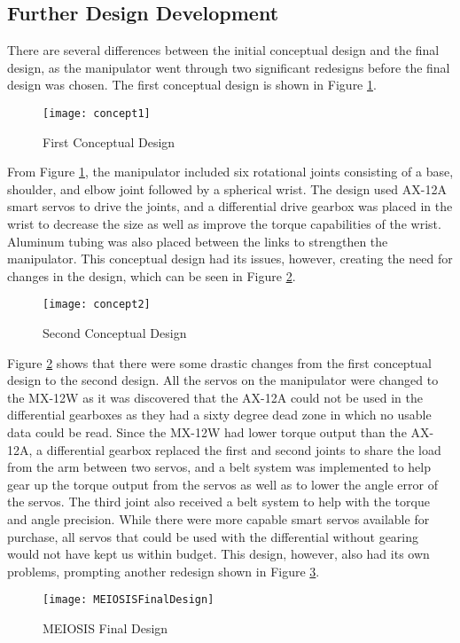 \subsection{Further Design Development}
There are several differences between the initial conceptual design and the final design, as the manipulator went through two significant redesigns before the final design was chosen. The first conceptual design is shown in Figure \ref{fig:concept1}.
\begin{figure}[htp]
  \centering
  \texttt{[image: concept1]}
  \caption{First Conceptual Design}
  \label{fig:concept1}
\end{figure}
From Figure \ref{fig:concept1}, the manipulator included six rotational joints consisting of a base, shoulder, and elbow joint followed by a spherical wrist. The design used AX-12A smart servos to drive the joints, and a differential drive gearbox was placed in the wrist to decrease the size as well as improve the torque capabilities of the wrist. Aluminum tubing was also placed between the links to strengthen the manipulator. This conceptual design had its issues, however, creating the need for changes in the design, which can be seen in Figure \ref{fig:concept2}.
\begin{figure}[htp]
  \centering
  \texttt{[image: concept2]}
  \caption{Second Conceptual Design}
  \label{fig:concept2}
\end{figure}
Figure \ref{fig:concept2} shows that there were some drastic changes from the first conceptual design to the second design. All the servos on the manipulator were changed to the MX-12W as it was discovered that the AX-12A could not be used in the differential gearboxes as they had a sixty degree dead zone in which no usable data could be read. Since the MX-12W had lower torque output than the AX-12A, a differential gearbox replaced the first and second joints to share the load from the arm between two servos, and a belt system was implemented to help gear up the torque output from the servos as well as to lower the angle error of the servos. The third joint also received a belt system to help with the torque and angle precision. While there were more capable smart servos available for purchase, all servos that could be used with the differential without gearing would not have kept us within budget. This design, however, also had its own problems, prompting another redesign shown in Figure \ref{fig:MEIOSISFinalDesign}.
\begin{figure}[htp]
  \centering
  \texttt{[image: MEIOSISFinalDesign]}
  \caption{MEIOSIS Final Design}
  \label{fig:MEIOSISFinalDesign}
\end{figure}
